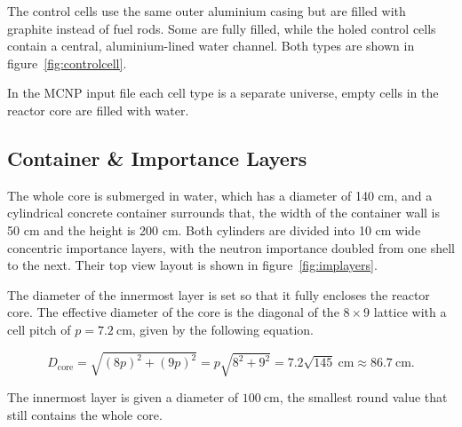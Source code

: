 The control cells use the same outer aluminium casing but are filled with graphite instead of fuel rods.
Some are fully filled, while the holed control cells contain a central, aluminium-lined water channel.
Both types are shown in figure~\ref{fig:controlcell}.



In the MCNP input file each cell type is a separate universe, empty cells in the reactor core are filled with water.

\newpage

\subsection{Container \& Importance Layers}

The whole core is submerged in water, which has a diameter of 140 cm, and a cylindrical concrete container surrounds that, the width of the container wall is 50 cm and the height is 200 cm.
Both cylinders are divided into 10 cm wide concentric importance layers, with the neutron importance doubled from one shell to the next.
Their top view layout is shown in figure~\ref{fig:implayers}.



The diameter of the innermost layer is set so that it fully encloses the reactor core.
The effective diameter of the core is the diagonal of the $8\times9$ lattice with a cell pitch of $p=7.2~\mathrm{cm}$, given by the following equation.

\begin{equation}
D_\mathrm{core} = \sqrt{(8p)^2 + (9p)^2} = p\sqrt{8^2 + 9^2} = 7.2\sqrt{145}~\mathrm{cm} \approx 86.7~\mathrm{cm}.
\end{equation}

The innermost layer is given a diameter of $100~\mathrm{cm}$, the smallest round value that still contains the whole core.

\newpage

